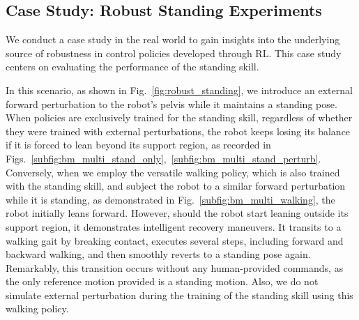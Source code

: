 \subsection{Case Study: Robust Standing Experiments}


We conduct a case study in the real world to gain insights into the underlying source of robustness in control policies developed through RL. 
This case study centers on evaluating the performance of the standing skill.

In this scenario, as shown in Fig.~\ref{fig:robust_standing}, we introduce an external forward perturbation to the robot's pelvis while it maintains a standing pose. 
When policies are exclusively trained for the standing skill, regardless of whether they were trained with external perturbations, the robot keeps losing its balance if it is forced to lean beyond its support region, as recorded in Figs.~\ref{subfig:bm_multi_stand_only},~\ref{subfig:bm_multi_stand_perturb}. 
Conversely, when we employ the versatile walking policy, which is also trained with the standing skill, and subject the robot to a similar forward perturbation while it is standing, as demonstrated in Fig.~\ref{subfig:bm_multi_walking}, the robot initially leans forward. However, should the robot start leaning outside its support region, it demonstrates intelligent recovery maneuvers. 
It transits to a walking gait by breaking contact, executes several steps, including forward and backward walking, and then smoothly reverts to a standing pose again. 
Remarkably, this transition occurs without any human-provided commands, as the only reference motion provided is a standing motion. 
Also, we do not simulate external perturbation during the training of the standing skill using this walking policy. 


